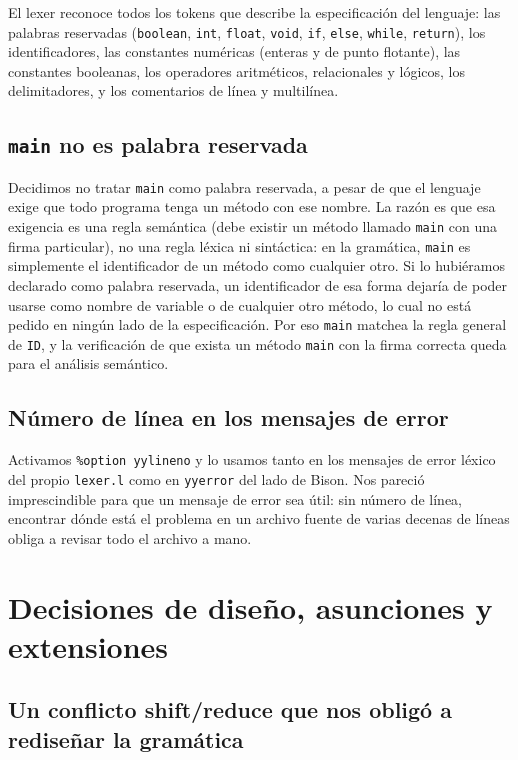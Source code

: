 \documentclass[11pt,a4paper]{article}
\begin{document}
El lexer reconoce todos los tokens que describe la especificación del
lenguaje: las palabras reservadas (\texttt{boolean}, \texttt{int},
\texttt{float}, \texttt{void}, \texttt{if}, \texttt{else}, \texttt{while},
\texttt{return}), los identificadores, las constantes numéricas (enteras y de
punto flotante), las constantes booleanas, los operadores aritméticos,
relacionales y lógicos, los delimitadores, y los comentarios de línea y
multilínea.

\subsection{\texttt{main} no es palabra reservada}

Decidimos no tratar \texttt{main} como palabra reservada, a pesar de que el
lenguaje exige que todo programa tenga un método con ese nombre. La razón es
que esa exigencia es una regla semántica (debe existir un método llamado
\texttt{main} con una firma particular), no una regla léxica ni sintáctica:
en la gramática, \texttt{main} es simplemente el identificador de un método
como cualquier otro. Si lo hubiéramos declarado como palabra reservada, un
identificador de esa forma dejaría de poder usarse como nombre de variable o
de cualquier otro método, lo cual no está pedido en ningún lado de la
especificación. Por eso \texttt{main} matchea la regla general de
\texttt{ID}, y la verificación de que exista un método \texttt{main} con la
firma correcta queda para el análisis semántico.

\subsection{Número de línea en los mensajes de error}

Activamos \texttt{\%option yylineno} y lo usamos tanto en los mensajes de
error léxico del propio \texttt{lexer.l} como en \texttt{yyerror} del lado de
Bison. Nos pareció imprescindible para que un mensaje de error sea útil: sin
número de línea, encontrar dónde está el problema en un archivo fuente de
varias decenas de líneas obliga a revisar todo el archivo a mano.

\section{Decisiones de diseño, asunciones y extensiones}
\label{sec:decisiones}

\subsection{Un conflicto shift/reduce que nos obligó a rediseñar la gramática}
\end{document}
